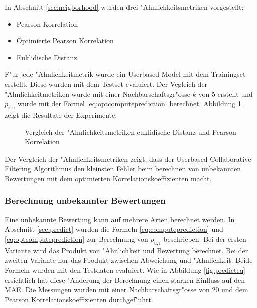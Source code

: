 \documentclass[a4paper, 12pt]{article}
\begin{document}
In Abschnitt \ref{sec:neigborhood} wurden drei "Ahnlichkeitsmetriken vorgestellt:

\begin{itemize}
\item Pearson Korrelation
\item Optimierte Pearson Korrelation
\item Euklidische Distanz
\end{itemize}

F"ur jede "Ahnlichkeitmetrik wurde ein Userbased-Model mit dem Trainingset erstellt. Diese wurden mit dem Testset evaluiert. Der Vegleich der "Ahnlichkeitmetriken wurde mit einer Nachbarschaftsgr"osse $k$ von 5 erstellt und $p_{i,u}$ wurde mit der Formel \ref{eq:optcomputeprediction} berechnet. Abbildung \ref{fig:comparesim} zeigt die Resultate der Experimente.

\begin{figure}
\centering
\label{fig:comparesim}
\caption{Vergleich der "Ahnlichkeitsmetriken euklidische Distanz und Pearson Korrelation}
\end{figure}

Der Vergleich der "Ahnlichkeitsmetriken zeigt, dass der Userbased Collaborative Filtering Algorithmus den kleinsten Fehler beim berechnen von unbekannten Bewertungen mit dem optimierten Korrelationskoeffizienten macht.

\subsubsection{Berechnung unbekannter Bewertungen}
\label{sec:eqpredictresults}

Eine unbekannte Bewertung kann auf mehrere Arten berechnet werden. In Abschnitt \ref{sec:predict} wurden die Formeln \ref{eq:computeprediction} und \ref{eq:optcomputeprediction} zur Berechnung  von $p_{u,i}$ beschrieben. Bei der ersten Variante wird das Produkt von "Ahnlichkeit und Bewertung berechnet. Bei der zweiten Variante nur das Produkt zwischen Abweichung und "Ahnlichkeit. Beide Formeln wurden mit den Testdaten evaluiert. Wie in Abbildung \ref{fig:predicteq} ersichtlich hat diese "Anderung der Berechnung einen starken Einfluss auf den MAE. Die Messungen wurden mit einer Nachbarschaftsgr"osse von 20 und dem Pearson Korrelationskoeffizienten durchgef"uhrt.
\end{document}
